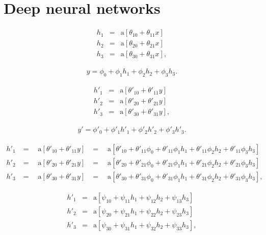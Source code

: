 \documentclass[letterpaper,twoside,openany, titlepage,oldfontcommands,titles,dvipsnames]{memoir}
\begin{document}
 \chapter{Deep neural networks}

\begin{eqnarray}\label{eq:dnn_comp_in}
 h_{1} &=& \mbox{a}[\theta_{10} + \theta_{11}x] \nonumber \\
 h_{2} &=& \mbox{a}[\theta_{20} + \theta_{21}x] \nonumber \\
 h_{3} &=& \mbox{a}[\theta_{30} + \theta_{31}x],
 \end{eqnarray}

\begin{eqnarray}\label{eq:dnn_comp}
 y = \phi_{0}+\phi_{1}h_{1}+\phi_{2}h_{2}+\phi_{3}h_{3}.
 \end{eqnarray}

\begin{eqnarray}\label{eq:dnn_comp_2}
 h'_{1} &=& \mbox{a}[\theta'_{10} + \theta'_{11}y] \nonumber \\
 h'_{2} &=& \mbox{a}[\theta'_{20} + \theta'_{21}y] \nonumber \\
 h'_{3} &=& \mbox{a}[\theta'_{30} + \theta'_{31}y],
 \end{eqnarray}

\begin{eqnarray} \label{eq:dnn_comp_out}
 y' = \phi'_{0}+\phi'_{1}h'_{1}+\phi'_{2}h'_{2}+\phi'_{3}h'_{3}.
 \end{eqnarray}

\begin{eqnarray}\label{eq:dnn_deep_linear}
 h'_{1} &=\quad \mbox{a}[\theta'_{10} + \theta'_{11}y] &=\quad \mbox{a}[\theta'_{10} + \theta'_{11}\phi_{0}+\theta'_{11}\phi_{1}h_{1}+\theta'_{11}\phi_{2}h_{2}+\theta'_{11}\phi_{3}h_{3}] \nonumber \\
 h'_{2} &= \quad\mbox{a}[\theta'_{20} + \theta'_{21}y] &=\quad \mbox{a}[\theta'_{20} + \theta'_{21}\phi_{0}+\theta'_{21}\phi_{1}h_{1}+\theta'_{21}\phi_{2}h_{2}+\theta'_{21}\phi_{3}h_{3}] \nonumber \\
 h'_{3} &=\quad \mbox{a}[\theta'_{30} + \theta'_{31}y] &=\quad \mbox{a}[\theta'_{30} + \theta'_{31}\phi_{0}+\theta'_{31}\phi_{1}h_{1}+\theta'_{31}\phi_{2}h_{2}+\theta'_{31}\phi_{3}h_{3}],
 \end{eqnarray}

\begin{eqnarray}\label{eq:dnn_three_layer_middle}
 h'_{1} &=& \mbox{a}[\psi_{10} + \psi_{11}h_{1}+ \psi_{12}h_{2}+ \psi_{13}h_{3}] \nonumber \\
 h'_{2} &=& \mbox{a}[\psi_{20} + \psi_{21}h_{1}+ \psi_{22}h_{2}+ \psi_{23}h_{3}] \nonumber \\
 h'_{3} &=& \mbox{a}[\psi_{30} + \psi_{31}h_{1}+ \psi_{32}h_{2}+ \psi_{33}h_{3}],
 \end{eqnarray}
\end{document}
